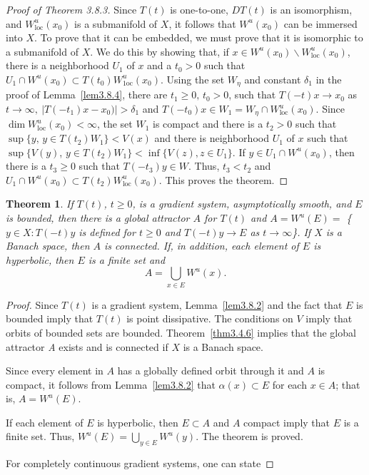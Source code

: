 \documentclass{surv-l}
\theoremstyle{plain}
\newtheorem{theorem}{Theorem}[section]
\theoremstyle{definition}
\numberwithin{equation}{section}
\numberwithin{figure}{chapter}
\begin{document}
\begin{proof}[Proof of Theorem 3.8.3]\label{pot3.8.3} Since $T(t)$ is one-to-one, $DT(t)$ is an isomorphism, and $W_{\mathrm{loc}}^{u}(x_{0})$ is a submanifold of $X$, it follows that $W^{u}(x_{0})$ can be immersed into $X$. To prove that it can be embedded, we must prove that it is isomorphic to a submanifold of $X$. We do this by showing that, if $ x\in W^{u}(x_{0})\backslash W_{\mathrm{loc}}^{u}(x_{0})$, there is a neighborhood $U_{1}$ of $x$ and a $t_{0}>0$ such that $U_{1}\cap W^{u}(x_{0})\subset T(t_{0})W_{\mathrm{1oc}}^{u}(x_{0})$. Using the set $W_{\eta}$ and constant $\delta_{1}$ in the proof of Lemma~\ref{lem3.8.4}, there are $t_{1}\geq 0,\, t_{0}>0$, such that $T(-t)x\rightarrow x_{0}$ as $ t\rightarrow \infty,\ |T(-t_{1})x-x_{0})|>\delta_{1}$ and $T(-t_{0})x\in W_{1}=W_{\eta}\cap W_{\mathrm{loc}}^{u}(x_{0})$. Since $\dim W_{\mathrm{loc}}^{u}(x_{0}) <\infty$, the set $W_{1}$ is compact and there is a $t_{2}>0$ such that $\displaystyle \sup\{y,\, y\in T(t_{2})W_{1}\}<V(x)$ and there is neighborhood $U_{1}$ of $x$ such that $\displaystyle \sup\{V(y)$, $ y\in T(t_{2})W_{1}\displaystyle \}<\inf\{V(z), z\in U_{1}\}$. If $y\in U_{1}\cap W^{u}(x_{0})$, then there is a $t_{3}\geq 0$ such that $T(-t_{3})y\in W$. Thus, $t_{3}<t_{2}$ and $U_{1}\cap W^{u}(x_{0})\subset T(t_{2})W_{\mathrm{loc}}^{u}(x_{0})$. This proves the theorem.
\end{proof}

\begin{theorem}\label{thm3.8.5} If $T(t)$, $t\geq 0$, is a gradient system, asymptotically smooth, and $E$ is bounded, then there is a global attractor $A$ for $T(t)$ and $A=W^{u}(E)=$ \{$y\in X\!:T(-t)y$ is defined for $t\geq 0$ and $T(-t)y\rightarrow E$ as $ t\rightarrow\infty$\}. If $X$ is a Banach space, then $A$ is connected. If, in addition, each element of $E$ is hyperbolic, then $E$ is a finite set and
\begin{equation*}
A=\bigcup_{x\in E}W^{u}(x).
\end{equation*}
\end{theorem}

\begin{proof} Since $T(t)$ is a gradient system, Lemma~\ref{lem3.8.2} and the fact that $E$ is bounded imply that $T(t)$ is point dissipative. The conditions on $V$ imply that orbits of bounded sets are bounded. Theorem~\ref{thm3.4.6} implies that the global attractor \emph{A} exists and is connected if $X$ is a Banach space.

Since every element in $A$ has a globally defined orbit through it and $A$ is compact, it follows from Lemma~\ref{lem3.8.2} that $\alpha(x)\subset E$ for each $x\in A$; that is, $A=W^{u}(E)$.

If each element of $E$ is hyperbolic, then $E\subset A$ and $A$ compact imply that $E$ is a finite set. Thus, $W^{u}(E)=\bigcup_{y\in E}W^{u}(y)$. The theorem is proved.

For completely continuous gradient systems, one can state
\end{proof}
\end{document}
